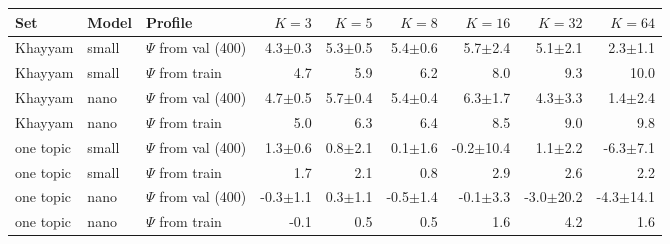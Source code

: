 \begin{tabular}{lllrrrrrr}
\toprule
Set & Model & Profile & $K=3$ & $K=5$ & $K=8$ & $K=16$ & $K=32$ & $K=64$ \\
\midrule
Khayyam & small & $\Psi$ from val (400) & 4.3$\pm$0.3 & 5.3$\pm$0.5 & 5.4$\pm$0.6 & 5.7$\pm$2.4 & 5.1$\pm$2.1 & 2.3$\pm$1.1 \\
Khayyam & small & $\Psi$ from train & 4.7 & 5.9 & 6.2 & 8.0 & 9.3 & 10.0 \\
Khayyam & nano & $\Psi$ from val (400) & 4.7$\pm$0.5 & 5.7$\pm$0.4 & 5.4$\pm$0.4 & 6.3$\pm$1.7 & 4.3$\pm$3.3 & 1.4$\pm$2.4 \\
Khayyam & nano & $\Psi$ from train & 5.0 & 6.3 & 6.4 & 8.5 & 9.0 & 9.8 \\
\midrule
one topic & small & $\Psi$ from val (400) & 1.3$\pm$0.6 & 0.8$\pm$2.1 & 0.1$\pm$1.6 & -0.2$\pm$10.4 & 1.1$\pm$2.2 & -6.3$\pm$7.1 \\
one topic & small & $\Psi$ from train & 1.7 & 2.1 & 0.8 & 2.9 & 2.6 & 2.2 \\
one topic & nano & $\Psi$ from val (400) & -0.3$\pm$1.1 & 0.3$\pm$1.1 & -0.5$\pm$1.4 & -0.1$\pm$3.3 & -3.0$\pm$20.2 & -4.3$\pm$14.1 \\
one topic & nano & $\Psi$ from train & -0.1 & 0.5 & 0.5 & 1.6 & 4.2 & 1.6 \\
\bottomrule
\end{tabular}
